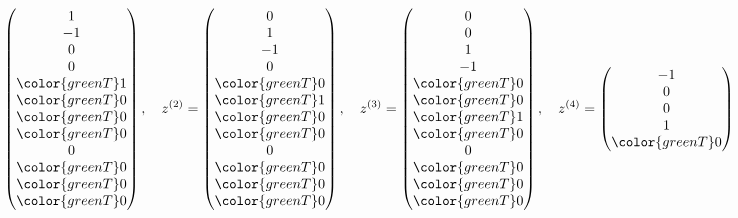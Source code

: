 \begin{loesung}
\[\begin{pmatrix}
              1\\
             -1\\
              0\\
              0\\
\color{greenT} 1\\
\color{greenT} 0\\
\color{greenT} 0\\
\color{greenT} 0\\
              0\\
\color{greenT} 0\\
\color{greenT} 0\\
\color{greenT} 0
\end{pmatrix}
,\quad
z^{(2)}=\begin{pmatrix}
              0\\
              1\\
             -1\\
              0\\
\color{greenT} 0\\
\color{greenT} 1\\
\color{greenT} 0\\
\color{greenT} 0\\
              0\\
\color{greenT} 0\\
\color{greenT} 0\\
\color{greenT} 0
\end{pmatrix}
,\quad
z^{(3)}=\begin{pmatrix}
              0\\
              0\\
              1\\
             -1\\
\color{greenT} 0\\
\color{greenT} 0\\
\color{greenT} 1\\
\color{greenT} 0\\
              0\\
\color{greenT} 0\\
\color{greenT} 0\\
\color{greenT} 0
\end{pmatrix}
,\quad
z^{(4)}=\begin{pmatrix}
             -1\\
              0\\
              0\\
              1\\
\color{greenT} 0\\

\end{pmatrix}\]
\end{loesung}
